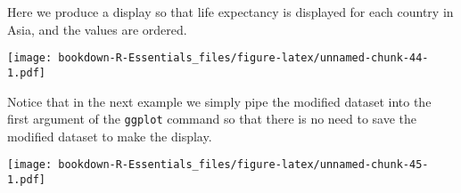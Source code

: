 \documentclass[]{book}
\newenvironment{Shaded}{\begin{snugshade}}{\end{snugshade}}
\newcommand{\KeywordTok}[1]{\textcolor[rgb]{0.13,0.29,0.53}{\textbf{#1}}}
\newcommand{\DataTypeTok}[1]{\textcolor[rgb]{0.13,0.29,0.53}{#1}}
\newcommand{\DecValTok}[1]{\textcolor[rgb]{0.00,0.00,0.81}{#1}}
\newcommand{\StringTok}[1]{\textcolor[rgb]{0.31,0.60,0.02}{#1}}
\newcommand{\CommentTok}[1]{\textcolor[rgb]{0.56,0.35,0.01}{\textit{#1}}}
\newcommand{\OperatorTok}[1]{\textcolor[rgb]{0.81,0.36,0.00}{\textbf{#1}}}
\newcommand{\NormalTok}[1]{#1}
\begin{document}
Here we produce a display so that life expectancy is displayed for each
country in Asia, and the values are ordered.

\begin{Shaded}
\end{Shaded}

\texttt{[image: bookdown-R-Essentials\_files/figure-latex/unnamed-chunk-44-1.pdf]}

Notice that in the next example we simply pipe the modified dataset into
the first argument of the \texttt{ggplot} command so that there is no
need to save the modified dataset to make the display.

\begin{Shaded}
\end{Shaded}

\texttt{[image: bookdown-R-Essentials\_files/figure-latex/unnamed-chunk-45-1.pdf]}
\end{document}
